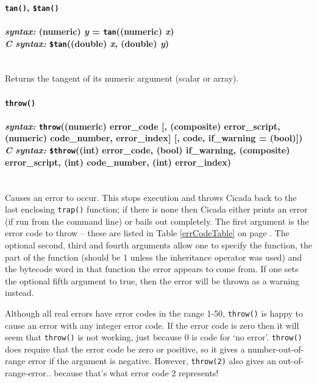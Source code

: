 \documentclass{article}
\begin{document}

\paragraph{\texttt{tan()}, \texttt{\$tan()}\\\\
\normalfont \emph{syntax: } (numeric) \emph{y} = \texttt{tan}((numeric) \emph{x})\\
\normalfont \emph{C syntax: } \texttt{\$tan}((double) \emph{x}, (double) \emph{y})\\\\}

Returns the tangent of its numeric argument (scalar or array).\\






\paragraph{\texttt{throw()}\\\\
\normalfont \emph{syntax: } \texttt{throw}((numeric) error\_code [, (composite) error\_script, (numeric) code\_number, error\_index] [, code, if\_warning = (bool)])\\
\normalfont \emph{C syntax: } \texttt{\$throw}((int) error\_code, (bool) if\_warning, (composite) error\_script, (int) code\_number, (int) error\_index)\\\\}

Causes an error to occur.  This stops execution and throws Cicada back to the last enclosing \texttt{trap()} function; if there is none then Cicada either prints an error (if run from the command line) or bails out completely.  The first argument is the error code to throw -- these are listed in Table \ref{errCodeTable} on page \pageref{errCodeTable}.  The optional second, third and fourth arguments allow one to specify the function, the part of the function (should be 1 unless the inheritance operator was used) and the bytecode word in that function the error appears to come from.  If one sets the optional fifth argument to true, then the error will be thrown as a warning instead.

Although all real errors have error codes in the range 1-50, \texttt{throw()} is happy to cause an error with any integer  error code.  If the error code is zero then it will seem that \texttt{throw()} is not working, just because 0 is code for `no error'.  \texttt{throw()} does require that the error code be zero or positive, so it gives a number-out-of-range error if the argument is negative.  However, \verb#throw(2)# also gives an out-of-range-error.. because that's what error code 2 represents!\\
\end{document}
